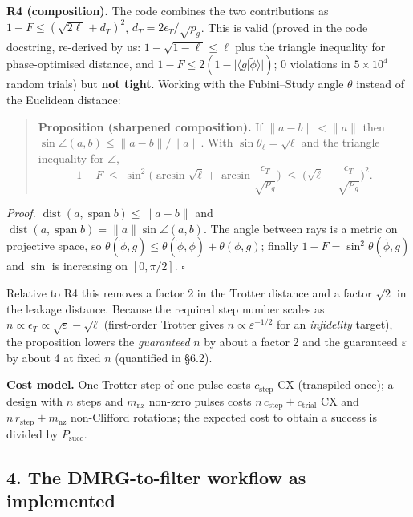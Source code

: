 \documentclass[
]{article}
\begin{document}
\textbf{R4 (composition).} The code combines the two contributions as
\(1-F\le(\sqrt{2\ell}+d_T)^2\), \(d_T=2\epsilon_T/\sqrt{p_g}\). This is
valid (proved in the code docstring, re-derived by us:
\(1-\sqrt{1-\ell}\le\ell\) plus the triangle inequality for
phase-optimised distance, and
\(1-F\le2(1-|\langle g|\tilde\phi\rangle|)\); 0 violations in
\(5\times10^4\) random trials) but \textbf{not tight}. Working with the
Fubini--Study angle \(\theta\) instead of the Euclidean distance:

\begin{quote}
\textbf{Proposition (sharpened composition).} If \(\|a-b\|<\|a\|\) then
\(\sin\angle(a,b)\le\|a-b\|/\|a\|\). With \(\sin\theta_\ell=\sqrt\ell\)
and the triangle inequality for \(\angle\),
\[1-F\;\le\;\sin^2\!\Big(\arcsin\sqrt{\ell}+\arcsin\frac{\epsilon_T}{\sqrt{p_g}}\Big)\;\le\;\Big(\sqrt\ell+\frac{\epsilon_T}{\sqrt{p_g}}\Big)^2 .\]
\end{quote}

\emph{Proof.} \(\operatorname{dist}(a,\operatorname{span}b)\le\|a-b\|\)
and
\(\operatorname{dist}(a,\operatorname{span}b)=\|a\|\sin\angle(a,b)\).
The angle between rays is a metric on projective space, so
\(\theta(\tilde\phi,g)\le\theta(\tilde\phi,\phi)+\theta(\phi,g)\);
finally \(1-F=\sin^2\theta(\tilde\phi,g)\) and \(\sin\) is increasing on
\([0,\pi/2]\). \(\square\)

Relative to R4 this removes a factor 2 in the Trotter distance and a
factor \(\sqrt2\) in the leakage distance. Because the required step
number scales as
\(n\propto\epsilon_T\propto\sqrt{\varepsilon}-\sqrt{\ell}\) (first-order
Trotter gives \(n\propto\varepsilon^{-1/2}\) for an \emph{infidelity}
target), the proposition lowers the \emph{guaranteed} \(n\) by about a
factor 2 and the guaranteed \(\varepsilon\) by about 4 at fixed \(n\)
(quantified in §6.2).

\textbf{Cost model.} One Trotter step of one pulse costs
\(c_{\mathrm{step}}\) CX (transpiled once); a design with \(n\) steps
and \(m_{\mathrm{nz}}\) non-zero pulses costs
\(n\,c_{\mathrm{step}}+c_{\mathrm{trial}}\) CX and
\(n\,r_{\mathrm{step}}+m_{\mathrm{nz}}\) non-Clifford rotations; the
expected cost to obtain a success is divided by \(P_{\mathrm{succ}}\).

\hypertarget{the-dmrg-to-filter-workflow-as-implemented}{%
\subsection{4. The DMRG-to-filter workflow as
implemented}\label{the-dmrg-to-filter-workflow-as-implemented}}
\end{document}

